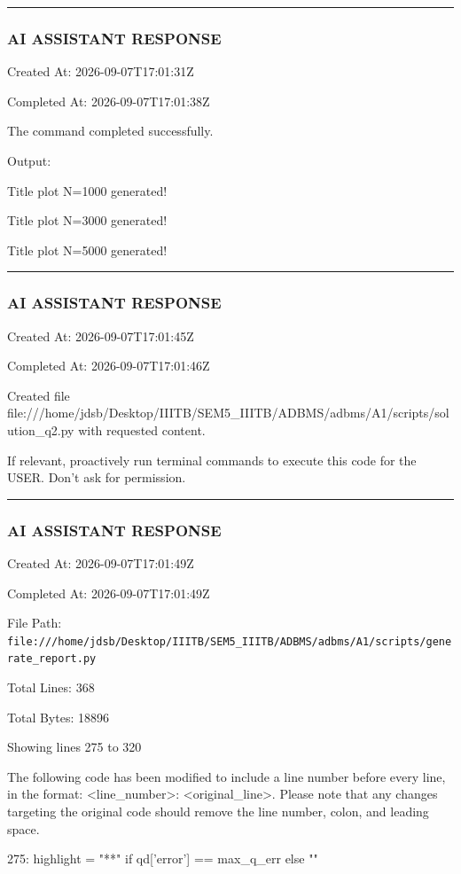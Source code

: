 \documentclass[11pt,a4paper]{article}
\begin{document}
\hrule

\subsubsection{AI ASSISTANT RESPONSE}

Created At: 2026-09-07T17:01:31Z

Completed At: 2026-09-07T17:01:38Z


The command completed successfully.

Output:

Title plot N=1000 generated!

Title plot N=3000 generated!

Title plot N=5000 generated!


\hrule

\subsubsection{AI ASSISTANT RESPONSE}

Created At: 2026-09-07T17:01:45Z

Completed At: 2026-09-07T17:01:46Z

Created file file:///home/jdsb/Desktop/IIITB/SEM5\_IIITB/ADBMS/adbms/A1/scripts/solution\_q2.py with requested content.

If relevant, proactively run terminal commands to execute this code for the USER. Don't ask for permission.


\hrule

\subsubsection{AI ASSISTANT RESPONSE}

Created At: 2026-09-07T17:01:49Z

Completed At: 2026-09-07T17:01:49Z

File Path: \texttt{file:///home/jdsb/Desktop/IIITB/SEM5\_IIITB/ADBMS/adbms/A1/scripts/generate\_report.py}

Total Lines: 368

Total Bytes: 18896

Showing lines 275 to 320

The following code has been modified to include a line number before every line, in the format: <line\_number>: <original\_line>. Please note that any changes targeting the original code should remove the line number, colon, and leading space.

275:         highlight = "**" if qd['error'] == max\_q\_err else ""
\end{document}

